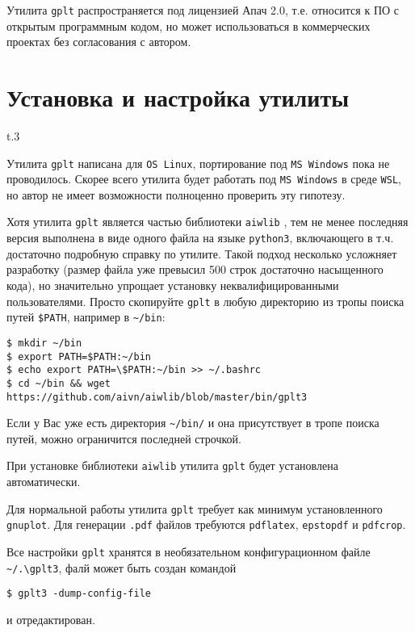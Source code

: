 \documentclass[12pt]{article}
\def\gplt{{\tt gplt}}
\def\gnuplot{{\tt gnuplot}}
\def\python{{\tt python3}}
\def\pdf{{\tt .pdf}}
\begin{document}
Утилита \gplt{} распространяется под лицензией Апач 2.0, т.е. относится к ПО с открытым программным кодом, но может использоваться в коммерческих проектах
без согласования с автором.

\section{Установка  и настройка утилиты}
\begin{wrapfigure}{t}{.3\textwidth}
  \vphantom{.}
  \vspace{-3cm}

\end{wrapfigure}
Утилита \gplt{} написана для \verb'OS Linux', портирование под \verb'MS Windows' пока не проводилось. Скорее всего утилита будет работать
под \verb'MS Windows' в среде \verb'WSL', но автор не имеет возможности полноценно проверить эту гипотезу.

Хотя утилита \gplt{} является частью библиотеки \verb'aiwlib' \cite{aiwlib:SR:PP2018,aiwlib:SV2018,aiwlib:git},
тем не менее последняя версия выполнена в виде одного файла на языке \python, включающего в т.ч. достаточно подробную справку по утилите.
Такой подход несколько усложняет разработку (размер файла уже превысил 500 строк достаточно насыщенного кода), но значительно упрощает установку
неквалифицированными пользователями. Просто скопируйте \gplt{} в любую директорию из тропы поиска путей \verb'$PATH', например в \verb'~/bin':
\begin{verbatim}
$ mkdir ~/bin
$ export PATH=$PATH:~/bin
$ echo export PATH=\$PATH:~/bin >> ~/.bashrc
$ cd ~/bin && wget https://github.com/aivn/aiwlib/blob/master/bin/gplt3 
\end{verbatim}
Если у Вас уже есть директория \verb'~/bin/' и она присутствует в тропе поиска путей, можно ограничится последней строчкой.

При установке библиотеки \verb'aiwlib' утилита \gplt{} будет установлена автоматически.

Для нормальной работы утилита \gplt{} требует как минимум установленного \gnuplot. Для генерации \pdf{} файлов требуются \verb'pdflatex', \verb'epstopdf'
и \verb'pdfcrop'. 

Все настройки \gplt{} хранятся в необязательном конфигурационном файле  \verb'~/.\gplt3',
фалй может быть создан командой
\begin{verbatim}
$ gplt3 -dump-config-file
\end{verbatim}
и отредактирован.\\
\end{document}
